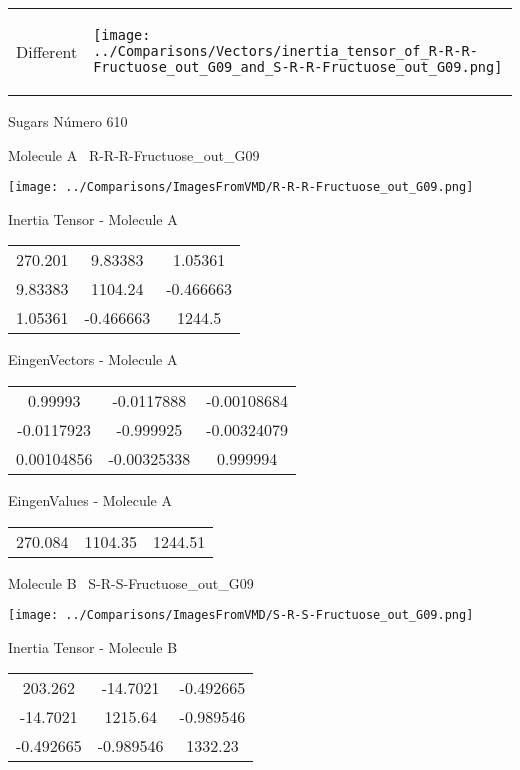 \vtab[-5mm]
\begin{tabular}{*{2}{m{}}}
\begin{center}
\textcolor{NavyBlue}{\Large Different}
\end{center}
&
\begin{center}
\texttt{[image: ../Comparisons/Vectors/inertia\_tensor\_of\_R-R-R-Fructuose\_out\_G09\_and\_S-R-R-Fructuose\_out\_G09.png]}
\end{center}
\end{tabular}

 \newpage

\vtab[-3cm]
\begin{center}
{\large Sugars \tab Número 610}
\end{center}
\begin{multicols}{2}
\begin{center}

Molecule A \
R-R-R-Fructuose\_out\_G09

\texttt{[image: ../Comparisons/ImagesFromVMD/R-R-R-Fructuose\_out\_G09.png]}

Inertia Tensor - Molecule A \\
\begin{tabular}{|c c c|}
270.201	 & 	9.83383	 & 	1.05361	 \\
9.83383	 & 	1104.24	 & 	-0.466663	 \\
1.05361	 & 	-0.466663	 & 	1244.5
\end{tabular}

\vtab
 EingenVectors - Molecule A     \\
\begin{tabular}{|c c c|}
0.99993	 & 	-0.0117888	 & 	-0.00108684	 \\
-0.0117923	 & 	-0.999925	 & 	-0.00324079	 \\
0.00104856	 & 	-0.00325338	 & 	0.999994
\end{tabular}

\vtab
 EingenValues - Molecule A     \\
\begin{tabular}{|c c c|}
270.084	 & 	1104.35	 & 	1244.51	 \\
\end{tabular}
\columnbreak

Molecule B \
S-R-S-Fructuose\_out\_G09

\texttt{[image: ../Comparisons/ImagesFromVMD/S-R-S-Fructuose\_out\_G09.png]}

Inertia Tensor - Molecule B \\
\begin{tabular}{|c c c|}
203.262	 & 	-14.7021	 & 	-0.492665	 \\
-14.7021	 & 	1215.64	 & 	-0.989546	 \\
-0.492665	 & 	-0.989546	 & 	1332.23
\end{tabular}


\end{center}
\end{multicols}

